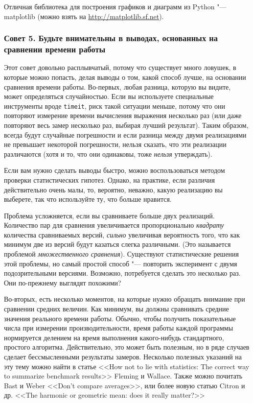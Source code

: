Отличная библиотека для построения графиков и диаграмм из Python "--- matplotlib (можно взять на \url{http://matplotlib.sf.net}).

\subsubsection*{Совет 5. Будьте внимательны в выводах, основанных на сравнении времени работы}

Этот совет довольно расплывчатый, потому что существует много ловушек, в которые можно попасть, делая выводы о том, какой способ лучше, на основании сравнения времени работы. Во-первых, любая разница, которую вы видите, может определяться случайностью. Если вы используете специальные инструменты вроде \texttt{timeit}, риск такой ситуации меньше, потому что они повторяют измерение времени вычисления выражения несколько раз (или даже повторяют весь замер несколько раз, выбирая лучший результат). Таким образом, всегда будут случайные погрешности и если разница между двумя реализациями не превышает некоторой погрешности, нельзя сказать, что эти реализации различаются (хотя и то, что они одинаковы, тоже \textit{нельзя} утверждать).

\begin{note}
Если вам нужно сделать выводы быстро, можно воспользоваться методом проверки статистических гипотез. Однако, на практике, если различия действительно очень малы, то, вероятно, неважно, какую реализацию вы выберете, так что используйте ту, что больше нравится.
\end{note}

Проблема усложняется, если вы сравниваете больше двух реализаций. Количество пар для сравнения увеличивается пропорционально \textit{квадрату} количества сравниваемых версий, \textit{сильно} увеличивая вероятность того, что как минимум две из версий будут казаться слегка различными. (Это называется проблемой \textit{множественного сравнения}). Существуют статистические решения этой проблемы, но самый простой способ "--- повторить эксперимент с двумя подозрительными версиями. Возможно, потребуется сделать это несколько раз. Они по-прежнему выглядят похожими?

Во-вторых, есть несколько моментов, на которые нужно обращать внимание при сравнении средних величин. Как минимум, вы должны сравнивать средние значения реального времени работы. Обычно, чтобы получить показательные числа при измерении производительности, время работы каждой программы нормируется делением на время выполнения какого-нибудь стандартного, простого алгоритма. Действительно, это может быть полезным, но в ряде случаев сделает бессмысленными результаты замеров. Несколько полезных указаний на эту тему можно найти в статье <<How not to lie with statistics: The correct way to summarize benchmark results>> Fleming и Wallace. Также можно почитать Bast и Weber <<Don't compare averages>>, или более новую статью Citron и др. <<The harmonic or geometric mean: does it really matter?>>


